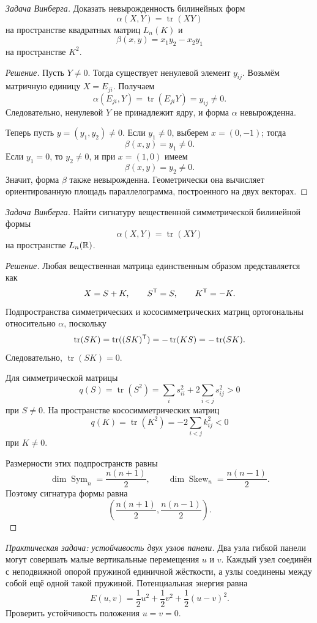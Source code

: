 \begin{problem}
\textit{Задача Винберга.}
Доказать невырожденность билинейных форм
\[
\alpha(X,Y)=\operatorname{tr}(XY)
\]
на пространстве квадратных матриц $L_n(K)$ и
\[
\beta(x,y)=x_1y_2-x_2y_1
\]
на пространстве $K^2$.
\end{problem}

\begin{proof}[Решение]
Пусть $Y\neq0$. Тогда существует ненулевой элемент $y_{ij}$. Возьмём матричную единицу $X=E_{ji}$. Получаем
\[
\alpha(E_{ji},Y)=\operatorname{tr}(E_{ji}Y)=y_{ij}\neq0.
\]
Следовательно, ненулевой $Y$ не принадлежит ядру, и форма $\alpha$ невырожденна.

Теперь пусть $y=(y_1,y_2)\neq0$. Если $y_1\neq0$, выберем $x=(0,-1)$; тогда
\[
\beta(x,y)=y_1\neq0.
\]
Если $y_1=0$, то $y_2\neq0$, и при $x=(1,0)$ имеем
\[
\beta(x,y)=y_2\neq0.
\]
Значит, форма $\beta$ также невырожденна. Геометрически она вычисляет ориентированную площадь параллелограмма, построенного на двух векторах.
\end{proof}

\begin{problem}
\textit{Задача Винберга.}
Найти сигнатуру вещественной симметрической билинейной формы
\[
\alpha(X,Y)=\operatorname{tr}(XY)
\]
на пространстве $L_n(\mathbb{R})$.
\end{problem}

\begin{proof}[Решение]
Любая вещественная матрица единственным образом представляется как
\[
X=S+K,
\qquad
S^{\mathsf{T}}=S,
\qquad
K^{\mathsf{T}}=-K.
\]
Подпространства симметрических и кососимметрических матриц ортогональны относительно $\alpha$, поскольку
\[
\operatorname{tr}(SK)
=
\operatorname{tr}((SK)^{\mathsf{T}})
=
-\operatorname{tr}(KS)
=
-\operatorname{tr}(SK).
\]
Следовательно, $\operatorname{tr}(SK)=0$.

Для симметрической матрицы
\[
q(S)=\operatorname{tr}(S^2)
=
\sum_i s_{ii}^2+2\sum_{i<j}s_{ij}^2>0
\]
при $S\neq0$. На пространстве кососимметрических матриц
\[
q(K)=\operatorname{tr}(K^2)
=
-2\sum_{i<j}k_{ij}^2<0
\]
при $K\neq0$.

Размерности этих подпространств равны
\[
\dim\operatorname{Sym}_n
=\frac{n(n+1)}2,
\qquad
\dim\operatorname{Skew}_n
=\frac{n(n-1)}2.
\]
Поэтому сигнатура формы равна
\[
\left(
\frac{n(n+1)}2,
\frac{n(n-1)}2
\right).
\]
\end{proof}

\begin{problem}
\textit{Практическая задача: устойчивость двух узлов панели.}
Два узла гибкой панели могут совершать малые вертикальные перемещения $u$ и $v$. Каждый узел соединён с неподвижной опорой пружиной единичной жёсткости, а узлы соединены между собой ещё одной такой пружиной. Потенциальная энергия равна
\[
E(u,v)
=
\frac12u^2+\frac12v^2+\frac12(u-v)^2.
\]
Проверить устойчивость положения $u=v=0$.
\end{problem}

